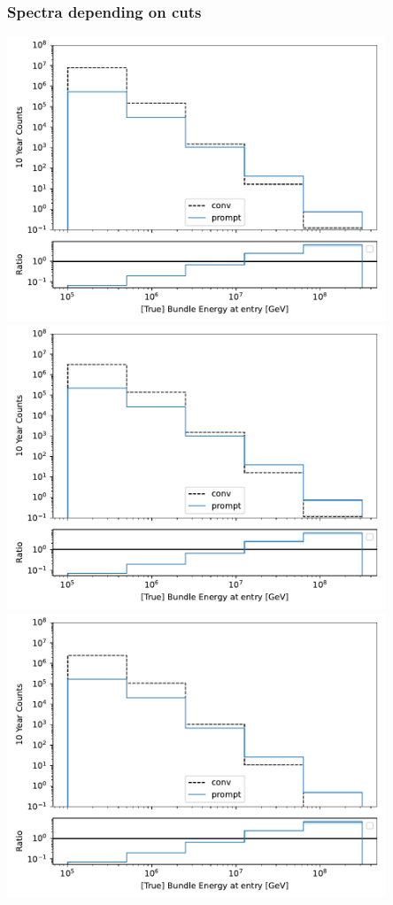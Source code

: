 \documentclass[aspectratio=1610, 9pt]{beamer}
\begin{document}
\begin{frame}
  \frametitle{Spectra depending on cuts}
  \begin{minipage}[t]{0.24\textwidth}
    \includegraphics[width=0.85\textwidth]{../Plots/bundle_spectrum_mc.pdf}
    \includegraphics[width=0.85\textwidth]{../Plots/bundle_spectrum_mc_5e5surface.pdf}
    \includegraphics[width=0.85\textwidth]{../Plots/bundle_spectrum_mc_5e5surface_quality.pdf}

\end{minipage}
\end{frame}
\end{document}
